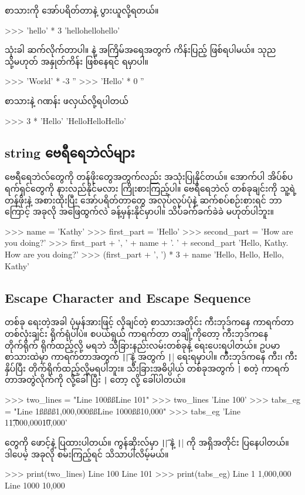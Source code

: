 စာသားကို \fCode{*} အော်ပရိတ်တာနဲ့ ပွားယူလို့ရတယ်။ 
\begin{codetxt}
>>> 'hello' * 3
'hellohellohello'
\end{codetxt}
 သုံးခါ ဆက်လိုက်တာပါ။  နဲ့ အကြိမ်အရေအတွက် ကိန်းပြည့် ဖြစ်ရပါမယ်။ သုည သို့မဟုတ် အနှုတ်ကိန်း ဖြစ်နေရင်   ရမှာပါ။
\begin{codetxt}
>>> 'World' * -3
''
>>> 'Hello' * 0
''
\end{codetxt}
စာသားနဲ့ ဂဏန်း ဖလှယ်လို့ရပါတယ်
\begin{codetxt}
>>> 3 * 'Hello'
'HelloHelloHello'
\end{codetxt}

\subsection*{string ဗေရီရေဘဲလ်များ}
ဗေရီရေဘဲလ်တွေကို  တန်ဖိုးတွေအတွက်လည်း အသုံးပြုနိုင်တယ်။ အောက်ပါ အိပ်စ်ပရက်ရှင်တွေကို နားလည်နိုင်မလား ကြိုးစားကြည့်ပါ။ ဗေရီရေဘဲလ် တစ်ခုချင်းကို သူ့ရဲ့တန်ဖိုးနဲ့ အစားထိုးပြီး \fCode{+}\fEn{,} \fCode{*} အော်ပရိတ်တာတွေ အလုပ်လုပ်ပုံနဲ့ ဆက်စပ်စဉ်းစားရင် ဘာကြောင့် အခုလို အဖြေထွက်လဲ ခန့်မှန်းနိုင်မှာပါ။ သိပ်ခက်ခက်ခဲခဲ မဟုတ်ပါဘူး။
\begin{codetxt}
>>> name = 'Kathy'
>>> first_part = 'Hello'
>>> second_part = 'How are you doing?'
>>> first_part + ', ' + name + '. ' + second_part
'Hello, Kathy. How are you doing?'
>>> (first_part + ', ') * 3 + name 
'Hello, Hello, Hello, Kathy'
\end{codetxt}

\subsection*{Escape Character and Escape Sequence}
 တစ်ခု ရေးတဲ့အခါ  ပုံမှန်အားဖြင့် လိုချင်တဲ့ စာသားအတိုင်း ကီးဘုဒ်ကနေ ကာရက်တာ တစ်လုံးချင်း ရိုက်ရုံပါပဲ။ စပယ်ရှယ် ကာရက်တာ တချို့ကိုတော့ ကီးဘုဒ်ကနေ တိုက်ရိုက် ရိုက်ထည့်လို့ မရဘဲ သီခြားနည်းလမ်းတစ်ခုနဲ့ ရေးပေးရပါတယ်။ ဥပမာ စာသားထဲမှာ  ကာရက်တာအတွက် \texttt|\t| နဲ့  အတွက် \texttt|\n| ရေးရမှာပါ။ ကီးဘုဒ်ကနေ  ကီး၊  ကီး နှိပ်ပြီး တိုက်ရိုက်ထည့်လို့မရပါဘူး။  သီးခြားအဓိပ္ပါယ် တစ်ခုအတွက် \texttt|\| နဲ့စတဲ့ ကာရက်တာအတွဲလိုက်ကို  လို့ခေါ်ပြီး \texttt|\| ကိုတော့  လို့ ခေါ်ပါတယ်။
\begin{codetxt}
>>> two_lines = "Line 100ßßLine 101"
>>> two_lines
'Line 100'
>>> tabs_eg = "Line 1ßßßß1,000,000ßßLine 1000ßß10,000"
>>> tabs_eg
'Line 1\t\t1,000,000\t10,000'
\end{codetxt}
 တွေကို  ဖောင့်နဲ့ ပြထားပါတယ်။  ကွန်ဆိုးလ်မှာ \texttt|\t| နဲ့ \texttt|\n| ကို အရှိအတိုင်း ပြနေပါတယ်။ ဒါပေမဲ့ အခုလို စမ်းကြည့်ရင် သိသာပါလိမ့်မယ်။ 
\begin{codetxt}
 >>> print(two_lines)
Line 100
Line 101
>>> print(tabs_eg)
Line 1          1,000,000
Line 1000       10,000 
\end{codetxt}


